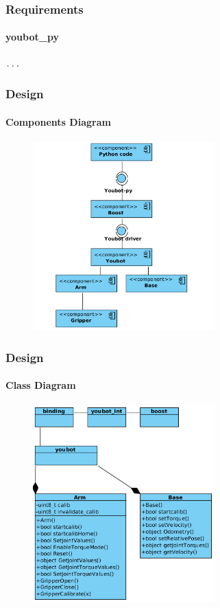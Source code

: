 \documentclass{beamer}
\begin{document}
\begin{frame}[fragile]
 \frametitle{Requirements}
 \framesubtitle{youbot\_py}
\begin{lstlisting}[language=C++]
...
\end{lstlisting}
\end{frame}








\begin{frame}
 \frametitle{Design}
 \framesubtitle{Components Diagram}
  \begin{figure}[ht!]
  \centering
  \includegraphics[width=70mm]{img/components.png}
  \caption{}
  \label{Component Diagram}
  \end{figure} 
\end{frame}


\begin{frame}
 \frametitle{Design}
 \framesubtitle{Class Diagram}
  \begin{figure}[ht!]
  \centering
  \includegraphics[width=70mm]{img/classdiagramm.png}
  \caption{}
  \label{Class Diagram}
  \end{figure}
 
\end{frame}
\end{document}
